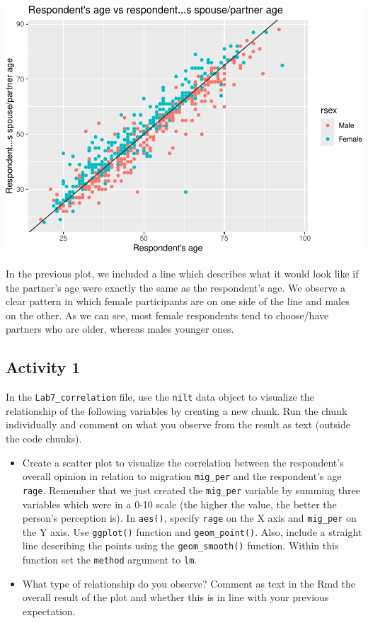 \documentclass[
]{book}
\providecommand{\tightlist}{%
  \setlength{\itemsep}{0pt}\setlength{\parskip}{0pt}}
\begin{document}
\begin{flushleft}\includegraphics[width=1\linewidth]{lab-workbook_files/figure-latex/unnamed-chunk-78-1} \end{flushleft}

In the previous plot, we included a line which describes what it would look like if the partner's age were exactly the same as the respondent's age. We observe a clear pattern in which female participants are on one side of the line and males on the other. As we can see, most female respondents tend to choose/have partners who are older, whereas males younger ones.

\hypertarget{activity-1-2}{%
\subsection{Activity 1}\label{activity-1-2}}

In the \texttt{Lab7\_correlation} file, use the \texttt{nilt} data object to visualize the relationship of the following variables by creating a new chunk. Run the chunk individually and comment on what you observe from the result as text (outside the code chunks).

\begin{itemize}
\tightlist
\item
  Create a scatter plot to visualize the correlation between the respondent's overall opinion in relation to migration \texttt{mig\_per} and the respondent's age \texttt{rage}. Remember that we just created the \texttt{mig\_per} variable by summing three variables which were in a 0-10 scale (the higher the value, the better the person's perception is). In \texttt{aes()}, specify \texttt{rage} on the X axis and \texttt{mig\_per} on the Y axis. Use \texttt{ggplot()} function and \texttt{geom\_point()}. Also, include a straight line describing the points using the \texttt{geom\_smooth()} function. Within this function set the \texttt{method} argument to \texttt{\textquotesingle{}lm\textquotesingle{}}.
\item
  What type of relationship do you observe? Comment as text in the Rmd the overall result of the plot and whether this is in line with your previous expectation.
\end{itemize}
\end{document}
